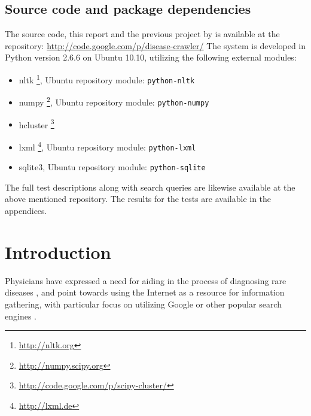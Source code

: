 \documentclass[10pt,letterpaper,two column,final]{article}
\begin{document}
\subsection{Source code and package dependencies}
The source code, this report and the previous project by
\cite{jensenandersen} is available at the repository:
\url{http://code.google.com/p/disease-crawler/}
The system is developed in Python version 2.6.6 on Ubuntu 10.10,
utilizing the following external modules:
\begin{itemize}
\item nltk \footnote{\url{http://nltk.org}}, Ubuntu repository module: \texttt{python-nltk}
\item numpy \footnote{\url{http://numpy.scipy.org}}, Ubuntu repository module: \texttt{python-numpy}
\item hcluster \footnote{\url{http://code.google.com/p/scipy-cluster/}}
\item lxml \footnote{\url{http://lxml.de}}, Ubuntu repository module: \texttt{python-lxml}
\item sqlite3, Ubuntu repository module: \texttt{python-sqlite}
\end{itemize}

The full test descriptions along with search queries are likewise
available at the above mentioned repository. The results for the tests
are available in the appendices.





\section{Introduction}
Physicians have expressed a need for aiding in the process of diagnosing
rare diseases \cite{googlingdiagnosis}, and point towards using the
Internet as a resource for information gathering, with particular focus
on utilizing Google or other popular search engines
\cite{googlechangemedicine} \cite{diagnosissearchengines}.
\end{document}
